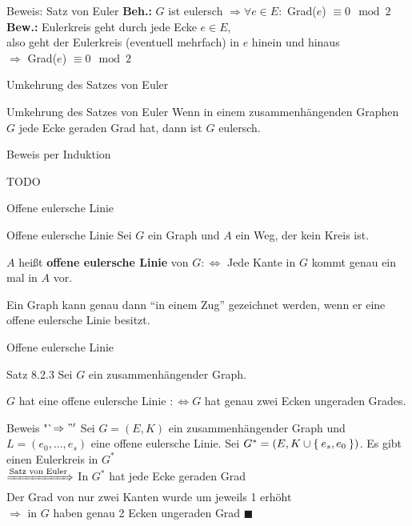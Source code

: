\begin{frame}{Beweis: Satz von Euler}
\textbf{Beh.:} $G$ ist eulersch $\Rightarrow \forall e \in E: $ Grad($e$) $\equiv 0 \mod 2$ \pause \\
\textbf{Bew.:} Eulerkreis geht durch jede Ecke $e \in E$\pause,  \\
also geht der Eulerkreis (eventuell mehrfach) in $e$ hinein und hinaus \pause \\
$\Rightarrow$ Grad($e$) $\equiv 0 \mod 2$
\end{frame}

\begin{frame}{Umkehrung des Satzes von Euler}
\begin{block}{Umkehrung des Satzes von Euler}
Wenn in einem zusammenhängenden Graphen $G$ jede Ecke geraden Grad hat, dann 
ist $G$ eulersch.
\end{block}

Beweis per Induktion

TODO
\end{frame}

\begin{frame}{Offene eulersche Linie}
\begin{block}{Offene eulersche Linie}
Sei $G$ ein Graph und $A$ ein Weg, der kein Kreis ist.

$A$ heißt \textbf{offene eulersche Linie} von $G :\Leftrightarrow$ Jede Kante in $G$ kommt genau ein mal in $A$ vor.
\end{block}

Ein Graph kann genau dann "`in einem Zug"' gezeichnet werden, wenn er eine 
offene eulersche Linie besitzt.
\end{frame}

\begin{frame}{Offene eulersche Linie}
\begin{block}{Satz 8.2.3}
Sei $G$ ein zusammenhängender Graph.

$G$ hat eine offene eulersche Linie $:\Leftrightarrow G$ hat genau zwei Ecken 
ungeraden Grades.
\end{block}

\pause

\begin{block}{Beweis "`$\Rightarrow"'$}
Sei $G=(E, K)$ ein zusammenhängender Graph und $L = (e_0, \dots, e_s)$ eine offene
eulersche Linie. \pause
Sei $G^* = (E, K \cup \Set{e_s, e_0})$. \pause
Es gibt einen Eulerkreis in $G^*$ \pause \\
$\xRightarrow{\text{Satz von Euler}}$ In $G^*$ hat jede Ecke geraden Grad \pause \\
Der Grad von nur zwei Kanten wurde um jeweils 1 erhöht \pause \\
$\Rightarrow$ in $G$ haben genau 2 Ecken ungeraden Grad $\blacksquare$
\end{block}
\end{frame}

